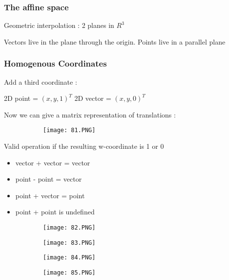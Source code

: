\documentclass{article}
\begin{document}
\vspace{40mm}

\subsubsection{The affine space}

Geometric interpolation : 2 planes in $R^3$

Vectors live in the plane through the origin.
Points live in a parallel plane 

\subsubsection{Homogenous Coordinates}

Add a third coordinate : 

2D point = $(x,y,1)^T$
2D vector = $(x,y,0)^T$

Now we can give a matrix representation of translations : 

\begin{figure}[ht!]
  \centering
  \begin{subfigure}[b]{0.4\linewidth}
    \texttt{[image: 81.PNG]}
  \end{subfigure}
\end{figure}

Valid operation if the resulting w-coordinate is 1 or 0

\begin{itemize}
    \item vector + vector = vector
    \item point - point = vector
    \item point + vector = point
    \item point + point is undefined
\end{itemize}

\begin{figure}[ht!]
  \centering
  \begin{subfigure}[b]{0.49\linewidth}
    \texttt{[image: 82.PNG]}
  \end{subfigure}
  \begin{subfigure}[b]{0.5\textwidth}
         \centering
         \texttt{[image: 83.PNG]}
     \end{subfigure}
\end{figure}


\begin{figure}[ht!]
  \centering
  \begin{subfigure}[b]{0.49\linewidth}
    \texttt{[image: 84.PNG]}
  \end{subfigure}
  \begin{subfigure}[b]{0.5\textwidth}
         \centering
         \texttt{[image: 85.PNG]}
     \end{subfigure}
\end{figure}
\end{document}
